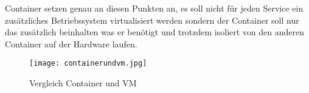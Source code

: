 Container setzen genau an diesen Punkten an, es soll nicht für jeden Service ein zusätzliches Betriebssystem virtualisiert werden sondern der Container soll nur das zusätzlich beinhalten was er benötigt und trotzdem isoliert von den anderen Container auf der Hardware laufen.\cite{12005068320161201,redhat}
\begin{figure}[H]
	\begin{center}
		\texttt{[image: containerundvm.jpg]}
	\end{center}
	\caption[Vergleich Container und VM]{Vergleich Container und VM \footnotemark}
	\label{fig:HW1}
\end{figure}

